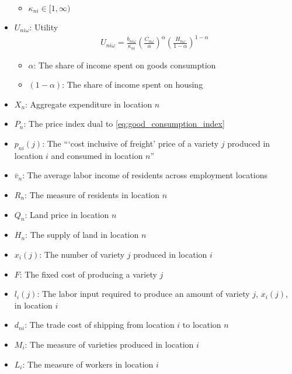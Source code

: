 \begin{itemize}
\begin{itemize}
            \item $\kappa_{n i} \in[1, \infty)$
        \end{itemize}
    \item $U_{n i \omega}$: Utility
        \begin{align}
            U_{n i \omega}=\frac{b_{n i \omega}}{\kappa_{n i}}\left(\frac{C_{n \omega}}{\alpha}\right)^\alpha\left(\frac{H_{n \omega}}{1-\alpha}\right)^{1-\alpha}
        \end{align}
        \begin{itemize}
            \item $\alpha$: The share of income spent on goods consumption
            \item $(1-\alpha)$: The share of income spent on housing
        \end{itemize}
    \item $X_n$: Aggregate expenditure in location $n$
    \item $P_n$: The price index dual to \eqref{eq:good_consumption_index}
    \item $p_{n i}(j)$: The  ```cost inclusive of freight' price of a variety $j$ produced in location $i$ and consumed in location $n$''
    \item $\bar{v}_n$: The average labor income of residents across employment locations
    \item $R_n$: The measure of residents in location $n$
    \item $Q_n$: Land price in location $n$
    \item $H_n$: The supply of land in location $n$
    \item $x_i(j)$: The number of variety $j$ produced in location $i$
    \item $F$: The fixed cost of producing a variety $j$
    \item $l_i(j)$: The labor input required to produce an amount of variety $j$, $x_i(j)$, in location $i$
    \item $d_{ni}$: The trade cost of shipping from location $i$ to location $n$
    \item $M_i$: The measure of varieties produced in location $i$
    \item $L_i$: The measure of workers in location $i$
\end{itemize}
